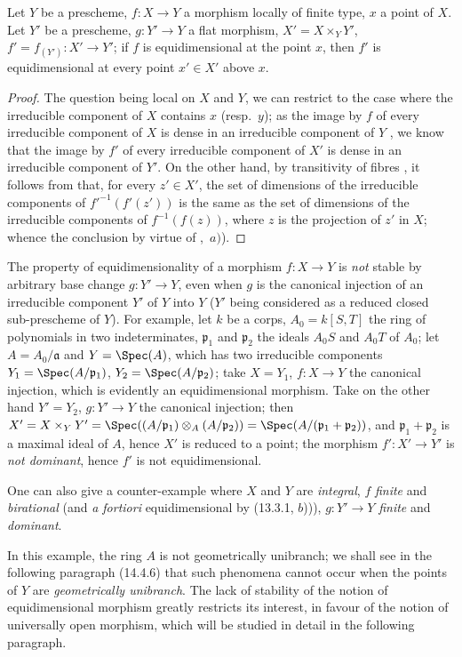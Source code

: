 
\begin{proposition}[13.3.8]
\label{IV.13.3.8}
Let $Y$ be a prescheme, $f:X\to Y$ a morphism locally of finite type, $x$ a point of $X$.
Let $Y'$ be a prescheme, $g:Y'\to Y$ a flat morphism, $X'=X\times_Y Y'$, $f'=f_{(Y')}:X'\to Y'$; if $f$ is equidimensional at the point $x$, then $f'$ is equidimensional at every point $x'\in X'$ above $x$.
\end{proposition}

\begin{proof}
The question being local on $X$ and $Y$, we can restrict to the case where the irreducible component of $X$ contains $x$ (resp.\ $y$); as the image by $f$ of every irreducible component of $X$ is dense in an irreducible component of $Y$ , we know  that the image by $f'$ of every irreducible component of $X'$ is dense in an irreducible component of $Y'$.
On the other hand, by transitivity of fibres , it follows from  that, for every $z'\in X'$, the set of dimensions of the irreducible components of ${f'}^{-1}(f'(z'))$ is the same as the set of dimensions of the irreducible components of $f^{-1}(f(z))$, where $z$ is the projection of $z'$ in $X$; whence the conclusion by virtue of ,~$a)$).
\end{proof}

\begin{remarks}[13.3.9]
\label{IV.13.3.9}
The property of equidimensionality of a morphism $f:X\to Y$ is \emph{not} stable by arbitrary base change $g:Y'\to Y$, even when $g$ is the canonical injection of an irreducible component $Y'$ of $Y$ into $Y$ ($Y'$ being considered as a reduced closed sub-prescheme of $Y$).
For example, let $k$ be a corps, $A_0=k[S,T]$ the ring of polynomials in two indeterminates, $\mathfrak{p}_1$ and $\mathfrak{p}_2$ the ideals $A_0 S$ and $A_0 T$ of $A_0$; let $A=A_0/\mathfrak{a}$ and $Y=\Spec(A)$, which has two irreducible components $Y_1=\Spec(A/\mathfrak{p}_1)$, $Y_2=\Spec(A/\mathfrak{p}_2)$; take $X=Y_1$, $f:X\to Y$ the canonical injection, which is evidently an equidimensional morphism.
Take on the other hand $Y'=Y_2$, $g:Y'\to Y$ the canonical injection; then $X'=X\times_Y Y'=\Spec((A/\mathfrak{p}_1)\otimes_A(A/\mathfrak{p}_2))=\Spec(A/(\mathfrak{p}_1+\mathfrak{p}_2))$, and $\mathfrak{p}_1+\mathfrak{p}_2$ is a maximal ideal of $A$, hence $X'$ is reduced to a point; the morphism $f':X'\to Y'$ is \emph{not dominant}, hence $f'$ is not equidimensional.

One can also give a counter-example where $X$ and $Y$ are \emph{integral}, $f$ \emph{finite} and \emph{birational} (and \emph{a fortiori} equidimensional by (13.3.1, $b$))), $g:Y'\to Y$ \emph{finite} and \emph{dominant}.

In this example, the ring $A$ is not geometrically unibranch; we shall see in the following paragraph (14.4.6) that such phenomena cannot occur when the points of $Y$ are \emph{geometrically unibranch}.
The lack of stability of the notion of equidimensional morphism greatly restricts its interest, in favour of the notion of universally open morphism, which will be studied in detail in the following paragraph.
\end{remarks}
